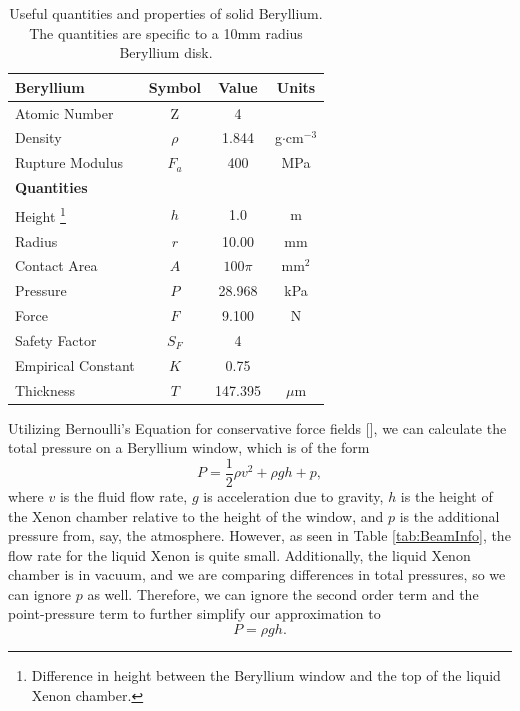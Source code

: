 \documentclass[%
reprint,
amsmath, amssymb,
aps,
floatfix,
]{revtex4-2}
\begin{document}
\begin{table}[h]
    \centering
    \begin{tabular}{lccc}
        \hline \hline
        \textbf{Beryllium} & \textbf{Symbol} & \textbf{Value} & \textbf{Units} \\
        \hline
        Atomic Number & Z & 4 & \\
        Density & $\rho$ & 1.844 & g$\cdot$cm$^{-3}$ \\
        Rupture Modulus & $F_a$ & 400 & MPa \\
        \hline \hline
        \textbf{Quantities} \\
        \hline
        Height 
        \footnote{Difference in height between the Beryllium window and the top of the liquid Xenon chamber.} 
        & $h$ & 1.0 & m \\
        Radius & $r$ & 10.00 & mm \\
        Contact Area & $A$ & $100\pi$ & mm$^2$ \\
        Pressure & $P$ & 28.968 & kPa \\
        Force & $F$ & 9.100 & N \\
        Safety Factor & $S_F$ & 4 \\
        Empirical Constant & $K$ & 0.75 \\
        Thickness & $T$ & 147.395 & $\mu$m \\
        \hline \hline
    \end{tabular}
    \caption{\label{tab:BeInfo}Useful quantities and properties of solid Beryllium.
    The quantities are specific to a 10mm radius Beryllium disk.}
\end{table}

Utilizing Bernoulli's Equation for conservative force fields [], we can calculate the total
pressure on a Beryllium window, which
is of the form
\begin{equation}
    P = \frac{1}{2} \rho v^2 + \rho g h + p,
\label{eq:Bern}
\end{equation}
where $v$ is the fluid flow rate, $g$ is acceleration due to gravity, $h$ is the height of the Xenon chamber
relative to the height of the window,
and $p$ is the additional pressure from, say, the atmosphere.
However, as seen in Table \ref{tab:BeamInfo}, the flow rate for the liquid Xenon is quite small.  Additionally,
the liquid Xenon chamber is in vacuum, and we are comparing differences in total pressures,
so we can ignore $p$ as well.  Therefore,
we can ignore the second order term and the point-pressure term to further simplify our approximation to
\begin{equation}
    P = \rho g h.
    \label{eq:BernSimp}
\end{equation}
\end{document}
